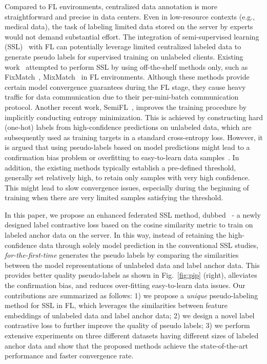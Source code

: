 \documentclass[withindex,glossary,firstyr]{cam-thesis}
\begin{document}
Compared to FL environments, centralized data annotation is more straightforward and precise in data centers. Even in low-resource contexts (e.g., medical data), the task of labeling limited data stored on the server by experts would not demand substantial effort. The integration of semi-supervised learning (SSL)~\citep{chapelle2009semi, yang2022survey,fixmatch,mixmatch} with FL can potentially leverage limited centralized labeled data to generate pseudo labels for supervised training on unlabeled clients. Existing work~\citep{jeong2020federated,zhang2021improving} attempted to perform SSL by using off-the-shelf methods only, such as FixMatch~\citep{fixmatch}, MixMatch~\citep{mixmatch} in FL environments. Although these methods provide certain model convergence guarantees during the FL stage, they cause heavy traffic for data communication due to their per-mini-batch communication protocol. Another recent work, SemiFL~\citep{semifl}, improves the training procedure by implicitly conducting entropy minimization. This is achieved by constructing hard (one-hot) labels from high-confidence predictions on unlabeled data, which are subsequently used as training targets in a standard cross-entropy loss. However, it is argued that using pseudo-labels based on model predictions might lead to a confirmation bias problem or overfitting to easy-to-learn data samples~\citep{nguyen2023boosting}. In addition, the existing methods typically establish a pre-defined threshold, generally set relatively high, to retain only samples with very high confidence.
This might lead to slow convergence issues, especially during the beginning of training when there are very limited samples satisfying the threshold.

In this paper, we propose an enhanced federated SSL method, dubbed \method ~- a newly designed label contrastive loss based on the cosine similarity metric to train on labeled anchor data on the server.
In this way, instead of retaining the high-confidence data through solely model prediction in the conventional SSL studies, \method \textit{for-the-first-time} generates the pseudo labels by comparing the similarities between the model representations of unlabeled data and label anchor data. This provides better quality pseudo-labels as shown in Fig.~\ref{fig:pip} (right), alleviates the confirmation bias, and reduces over-fitting easy-to-learn data issues. Our contributions are summarized as follows: 1) we propose a \textit{unique} pseudo-labeling method \method for SSL in FL, which leverages the similarities between feature embeddings of unlabeled data and label anchor data; 2) we design a novel label contrastive loss to further improve the quality of pseudo labels; 3) we perform extensive experiments on three different datasets having different sizes of labeled anchor data and show that the proposed methods achieve the state-of-the-art performance and faster convergence rate.
\end{document}
